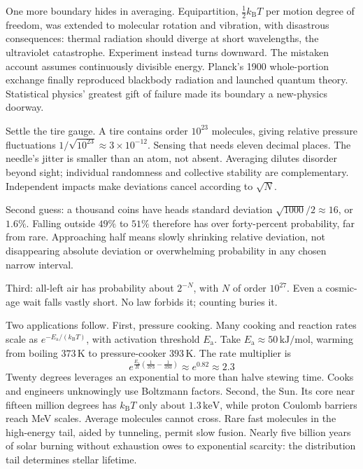 One more boundary hides in averaging. Equipartition, \(\tfrac12 k_{\mathrm B}T\) per motion degree of freedom, was extended to molecular rotation and vibration, with disastrous consequences: thermal radiation should diverge at short wavelengths, the ultraviolet catastrophe. Experiment instead turns downward. The mistaken account assumes continuously divisible energy. Planck's 1900 whole-portion exchange finally reproduced blackbody radiation and launched quantum theory. Statistical physics' greatest gift of failure made its boundary a new-physics doorway.


Settle the tire gauge. A tire contains order \(10^{23}\) molecules, giving relative pressure fluctuations \(1/\sqrt{10^{23}}\approx3\times10^{-12}\). Sensing that needs eleven decimal places. The needle's jitter is smaller than an atom, not absent. Averaging dilutes disorder beyond sight; individual randomness and collective stability are complementary. Independent impacts make deviations cancel according to \(\sqrt{N}\).

Second guess: a thousand coins have heads standard deviation \(\sqrt{1000}/2\approx16\), or \(1.6\%\). Falling outside \(49\%\) to \(51\%\) therefore has over forty-percent probability, far from rare. Approaching half means slowly shrinking relative deviation, not disappearing absolute deviation or overwhelming probability in any chosen narrow interval.

Third: all-left air has probability about \(2^{-N}\), with \(N\) of order \(10^{27}\). Even a cosmic-age wait falls vastly short. No law forbids it; counting buries it.

Two applications follow. First, pressure cooking. Many cooking and reaction rates scale as \(e^{-E_{\mathrm a}/(k_{\mathrm B}T)}\), with activation threshold \(E_{\mathrm a}\). Take \(E_{\mathrm a}\approx50\,\mathrm{kJ/mol}\), warming from boiling \(373\,\mathrm{K}\) to pressure-cooker \(393\,\mathrm{K}\). The rate multiplier is
\[
e^{\frac{E_{\mathrm a}}{R}\left(\frac1{373}-\frac1{393}\right)} \approx e^{0.82} \approx 2.3
\]
Twenty degrees leverages an exponential to more than halve stewing time. Cooks and engineers unknowingly use Boltzmann factors. Second, the Sun. Its core near fifteen million degrees has \(k_{\mathrm B}T\) only about \(1.3\,\mathrm{keV}\), while proton Coulomb barriers reach MeV scales. Average molecules cannot cross. Rare fast molecules in the high-energy tail, aided by tunneling, permit slow fusion. Nearly five billion years of solar burning without exhaustion owes to exponential scarcity: the distribution tail determines stellar lifetime.

